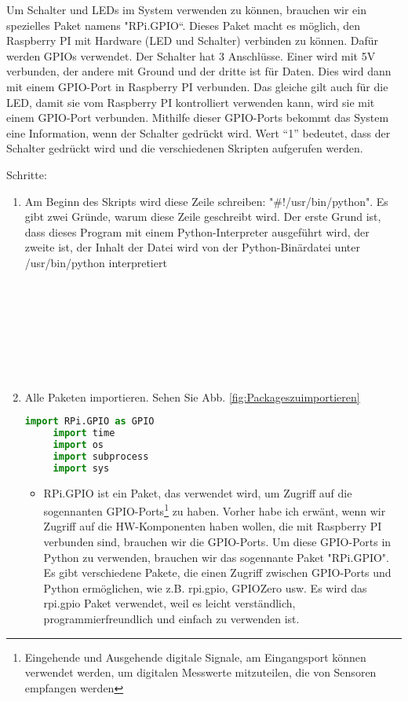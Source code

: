 Um Schalter und LEDs im System verwenden zu k\"onnen, brauchen wir ein spezielles Paket namens "RPi.GPIO“. Dieses Paket macht es m\"oglich, den Raspberry PI mit Hardware (LED und Schalter) verbinden zu k\"onnen. Daf\"ur werden GPIOs verwendet. Der Schalter hat 3 Anschl\"usse. Einer wird mit 5V verbunden, der andere mit Ground und der dritte ist f\"ur Daten. Dies wird dann mit einem GPIO-Port in Raspberry PI verbunden. Das gleiche gilt auch f\"ur die LED, damit sie vom Raspberry PI kontrolliert verwenden kann, wird sie mit einem GPIO-Port verbunden. Mithilfe dieser GPIO-Ports bekommt das System eine Information, wenn der Schalter gedr\"uckt wird. Wert ``1'' bedeutet, dass der Schalter gedr\"uckt wird und die verschiedenen Skripten aufgerufen werden. 

Schritte: 
\begin{enumerate}
	
	\item Am Beginn des Skripts wird diese Zeile schreiben: "\#!/usr/bin/python". Es gibt zwei Gr\"unde, warum diese Zeile geschreibt wird. Der erste Grund ist, dass dieses Program mit einem Python-Interpreter ausgef\"uhrt wird, der zweite ist, der Inhalt der Datei wird von der Python-Binärdatei unter /usr/bin/python interpretiert \\ \\ \\ \\ \\ \\ \\ \\ 
	 \item Alle Paketen importieren. Sehen Sie Abb. \ref{fig:Packageszuimportieren} 
	 \begin{lstlisting}[caption={Packages zu importieren},label={fig:Packageszuimportieren},language=Python]
	 import RPi.GPIO as GPIO
	 import time
	 import os
	 import subprocess
	 import sys
	 \end{lstlisting}
	 \begin{itemize}
	 	
	 \item RPi.GPIO ist ein Paket, das verwendet wird, um Zugriff auf die sogennanten GPIO-Ports\footnote{Eingehende und Ausgehende digitale Signale, am Eingangsport k\"onnen verwendet werden, um  digitalen Messwerte mitzuteilen, die von Sensoren empfangen werden} zu haben. Vorher habe ich erw\"ant, wenn wir Zugriff auf die HW-Komponenten haben wollen, die mit Raspberry PI verbunden sind, brauchen wir die GPIO-Ports. Um diese GPIO-Ports in Python zu verwenden, brauchen wir das sogennante Paket "RPi.GPIO". Es gibt verschiedene Pakete, die einen Zugriff zwischen GPIO-Ports und Python erm\"oglichen, wie z.B. rpi.gpio, GPIOZero usw. Es wird das rpi.gpio Paket verwendet, weil es leicht verst\"andlich, programmierfreundlich und einfach zu verwenden ist. \cite{rpigpio}
	 

\end{itemize}
\end{enumerate}

